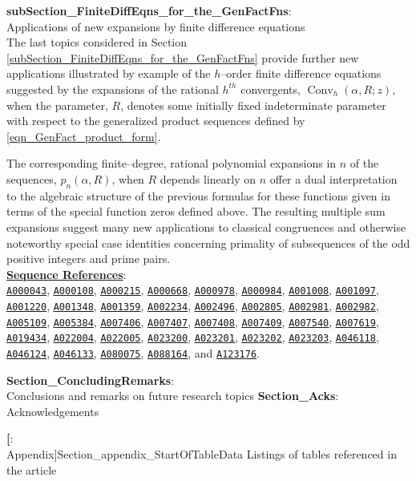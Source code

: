 \documentclass[12pt,reqno]{article}
\numberwithin{sfootnote}{section}
\numberwithin{equation}{section}
\newcommand{\itemlabel}[1]{\textbf{#1}: \\ }
\theoremstyle{plain}
\theoremstyle{definition}
\theoremstyle{remark}
\newcommand{\seqnum}[1]{\href{http://oeis.org/#1}{\texttt{\underline{#1}}}}
\newcommand{\pn}[3]{\ensuremath{p_{#1}\left(#2, #3\right)}}
\newcommand{\ConvGF}[4]{\ensuremath{\Conv_{#1}\left(#2, #3; #4\right)}}
\DeclareMathOperator{\Conv}{Conv}
\begin{document}
\begin{enumerate}[leftmargin=\parindent,itemsep=-1mm]
\itemlabel{subSection_FiniteDiffEqns_for_the_GenFactFns}{ 
           Applications of new 
           expansions by finite difference equations} \\ 
The last topics considered in 
Section \ref{subSection_FiniteDiffEqns_for_the_GenFactFns} 
provide further new applications illustrated by example of the 
$h$--order finite difference equations suggested by the 
expansions of the rational $h^{th}$ convergents, 
$\ConvGF{h}{\alpha}{R}{z}$, when the parameter, $R$, 
denotes some initially fixed indeterminate parameter with respect to the 
generalized product sequences defined by \eqref{eqn_GenFact_product_form}. 

The corresponding finite--degree, rational polynomial expansions in $n$ of the 
sequences, $\pn{n}{\alpha}{R}$, when $R$ depends linearly on $n$ 
offer a dual interpretation to the algebraic structure of the 
previous formulas for these functions 
given in terms of the special function zeros 
defined above. 
The resulting multiple sum expansions suggest 
many new applications to classical congruences and otherwise 
noteworthy special case identities concerning primality of 
subsequences of the odd positive integers and prime pairs. \\ 
{ 
     \smaller
     \textbf{\underline{Sequence References}}: \\ 
     \seqnum{A000043}, \seqnum{A000108}, \seqnum{A000215}, \seqnum{A000668}, 
     \seqnum{A000978}, \seqnum{A000984}, \seqnum{A001008}, \seqnum{A001097}, 
     \seqnum{A001220}, \seqnum{A001348}, \seqnum{A001359}, \seqnum{A002234}, 
     \seqnum{A002496}, \seqnum{A002805}, \seqnum{A002981}, \seqnum{A002982}, 
     \seqnum{A005109}, \seqnum{A005384}, \seqnum{A007406}, \seqnum{A007407}, 
     \seqnum{A007408}, \seqnum{A007409}, \seqnum{A007540}, \seqnum{A007619}, 
     \seqnum{A019434}, \seqnum{A022004}, \seqnum{A022005}, \seqnum{A023200}, 
     \seqnum{A023201}, \seqnum{A023202}, \seqnum{A023203}, \seqnum{A046118}, 
     \seqnum{A046124}, \seqnum{A046133}, \seqnum{A080075}, \seqnum{A088164}, 
     and \seqnum{A123176}. 
} 

\itemlabel{Section_ConcludingRemarks}{Conclusions and 
           remarks on future research topics} 
\itemlabel{Section_Acks}{Acknowledgements} 

\itemlabel[Appendix]{Section_appendix_StartOfTableData}{ 
          Listings of tables referenced in the article}
\begin{enumerate}[leftmargin=\parindent,itemsep=-1mm] 
     \renewcommand{\itemlabel}[3][Section]{ 
          \item {\normalsize \textbf{\underline{#1 \ref{#2}}}.\ 
          \textrm{\textbf{#3}}.\ } 
     } 


\end{enumerate}
\end{enumerate}
\end{document}
